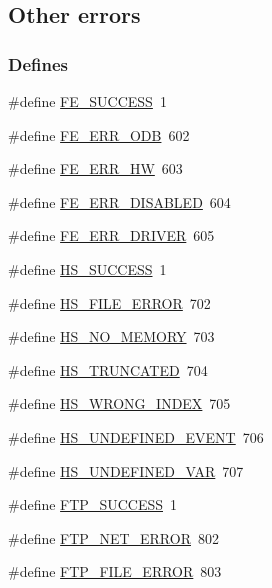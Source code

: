 \subsection{Other errors}
\label{group__err26}
\subsubsection*{Defines}
\begin{DoxyCompactItemize}
\item 
\#define \hyperlink{group__err26_ga23395a243c74edd61ed4ce0df1256419}{FE\_\-SUCCESS}~1
\item 
\#define \hyperlink{group__err26_ga8a0cc5de6ea758c61231a11b6a076e1f}{FE\_\-ERR\_\-ODB}~602
\item 
\#define \hyperlink{group__err26_ga9fea053c26a278026fa0d7501c300c4f}{FE\_\-ERR\_\-HW}~603
\item 
\#define \hyperlink{group__err26_gae7f0996583000c6c16916cdc846b753a}{FE\_\-ERR\_\-DISABLED}~604
\item 
\#define \hyperlink{group__err26_gac4221d7e494c798f57552f502e2459ef}{FE\_\-ERR\_\-DRIVER}~605
\item 
\#define \hyperlink{group__err26_ga2d533509db8628a7e0eb794e2b3e77b0}{HS\_\-SUCCESS}~1
\item 
\#define \hyperlink{group__err26_ga564032fce62ccc4689bd3b5864ad0f9c}{HS\_\-FILE\_\-ERROR}~702
\item 
\#define \hyperlink{group__err26_ga8d2556d6b5d8902646a36e3aa7e71dc5}{HS\_\-NO\_\-MEMORY}~703
\item 
\#define \hyperlink{group__err26_ga8b8cfc047a951f9afe9f833484d7e814}{HS\_\-TRUNCATED}~704
\item 
\#define \hyperlink{group__err26_gab8c5289d12d853f0d8266cdf37c39b08}{HS\_\-WRONG\_\-INDEX}~705
\item 
\#define \hyperlink{group__err26_gad7b85d13f7ee77c6d195ed38380bbc27}{HS\_\-UNDEFINED\_\-EVENT}~706
\item 
\#define \hyperlink{group__err26_ga1b25c77e3145468cf83f8e88bf1e0804}{HS\_\-UNDEFINED\_\-VAR}~707
\item 
\#define \hyperlink{group__err26_ga608032c83acbacc7557d2d04b9ad9a8b}{FTP\_\-SUCCESS}~1
\item 
\#define \hyperlink{group__err26_gaad8d88aaaaaa3706732a8a5aa00a6723}{FTP\_\-NET\_\-ERROR}~802
\item 
\#define \hyperlink{group__err26_ga8f62a67a3788241e74228be45c8d1334}{FTP\_\-FILE\_\-ERROR}~803
\item 

\end{DoxyCompactItemize}
